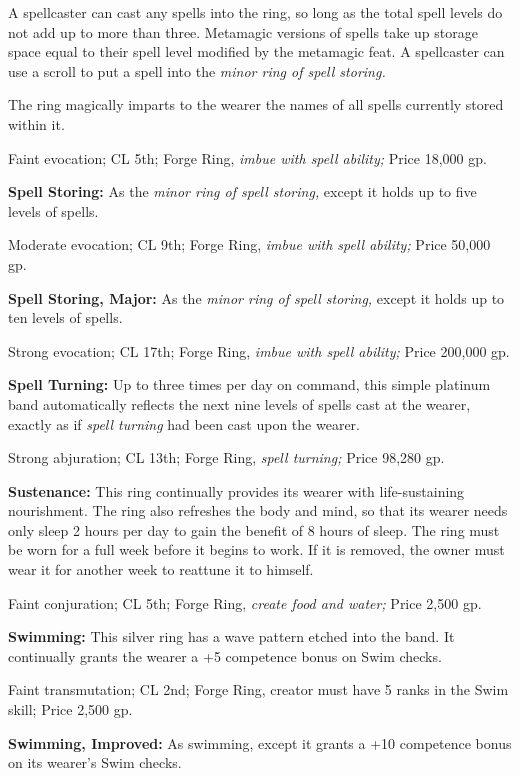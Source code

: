 A spellcaster can cast any spells into the ring, so long as the total spell levels 
do not add up to more than three. Metamagic versions of spells take up storage 
space equal to their spell level modified by the metamagic feat. A spellcaster 
can use a scroll to put a spell into the \textit{minor ring of spell storing.}

The ring magically imparts to the wearer the names of all spells currently stored 
within it.

Faint evocation; CL 5th; Forge Ring, \textit{imbue with spell ability; }Price 18,000 
gp.

\textbf{Spell Storing:} As the \textit{minor ring of spell storing, }except it 
holds up to five levels of spells.

Moderate evocation; CL 9th; Forge Ring, \textit{imbue with spell ability; }Price 
50,000 gp.

\textbf{Spell Storing, Major:} As the \textit{minor ring of spell storing, }except 
it holds up to ten levels of spells.

Strong evocation; CL 17th; Forge Ring, \textit{imbue with spell ability; }Price 
200,000 gp.

\textbf{Spell Turning:} Up to three times per day on command, this simple platinum 
band automatically reflects the next nine levels of spells cast at the wearer, 
exactly as if \textit{spell turning }had been cast upon the wearer.

Strong abjuration; CL 13th; Forge Ring, \textit{spell turning; }Price 98,280 gp.

\textbf{Sustenance: }This ring continually provides its wearer with life-sustaining 
nourishment. The ring also refreshes the body and mind, so that its wearer needs 
only sleep 2 hours per day to gain the benefit of 8 hours of sleep. The ring must 
be worn for a full week before it begins to work. If it is removed, the owner must 
wear it for another week to reattune it to himself.

Faint conjuration; CL 5th; Forge Ring, \textit{create food and water; }Price 2,500 
gp.

\textbf{Swimming:} This silver ring has a wave pattern etched into the band. It 
continually grants the wearer a +5 competence bonus on Swim checks.

Faint transmutation; CL 2nd; Forge Ring, creator must have 5 ranks in the Swim 
skill; Price 2,500 gp.

\textbf{Swimming, Improved:} As swimming, except it grants a +10 competence bonus 
on its wearer's Swim checks.

